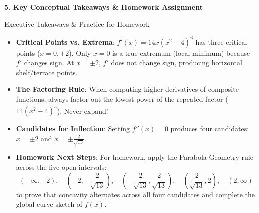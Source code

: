 \documentclass[11pt]{article}
\begin{document}
\vspace{3pt}
\textbf{\normalsize \textcolor{dukeNavy}{5. Key Conceptual Takeaways \& Homework Assignment}}
\vspace{1pt}

\begin{calloutbox}{Executive Takeaways \& Practice for Homework}
\begin{itemize}[leftmargin=1.2em, itemsep=2pt, topsep=1pt]
  \item \textbf{Critical Points vs. Extrema}: $f'(x) = 14x(x^2 - 4)^6$ has three critical points ($x = 0, \pm 2$). Only $x = 0$ is a true extremum (local minimum) because $f'$ changes sign. At $x = \pm 2$, $f'$ does not change sign, producing horizontal shelf/terrace points.
  \item \textbf{The Factoring Rule}: When computing higher derivatives of composite functions, always factor out the lowest power of the repeated factor ($14(x^2 - 4)^5$). Never expand!
  \item \textbf{Candidates for Inflection}: Setting $f''(x) = 0$ produces four candidates: $x = \pm 2$ and $x = \pm \frac{2}{\sqrt{13}}$.
  \item \textbf{Homework Next Steps}: For homework, apply the Parabola Geometry rule across the five open intervals:
  \[
  (-\infty, -2), \quad \left(-2, -\frac{2}{\sqrt{13}}\right), \quad \left(-\frac{2}{\sqrt{13}}, \frac{2}{\sqrt{13}}\right), \quad \left(\frac{2}{\sqrt{13}}, 2\right), \quad (2, \infty)
  \]
  to prove that concavity alternates across all four candidates and complete the global curve sketch of $f(x)$.
\end{itemize}
\end{calloutbox}
\end{document}
